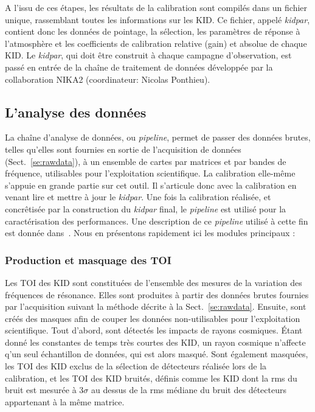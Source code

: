 A l'issu de ces étapes, les résultats de la calibration sont compilés
dans un fichier unique, rassemblant toutes les informations sur les
KID. Ce fichier, appelé \emph{kidpar}, contient donc les données de
pointage, la sélection, les paramètres de réponse à l'atmosphère et
les coefficients de calibration relative (gain) et absolue de chaque
KID. Le \emph{kidpar}, qui doit être construit à chaque campagne
d'observation, est passé en entrée de la chaîne de traitement de
données développée par la collaboration NIKA2 (coordinateur: Nicolas
Ponthieu).

\subsection{L'analyse des données}

La chaîne d'analyse de données, ou \emph{pipeline}, permet de passer
des données brutes, telles qu'elles sont fournies en sortie de
l'acquisition de données (Sect.~\ref{se:rawdata}), à un ensemble de
cartes par matrices et par bandes de fréquence, utilisables pour
l'exploitation scientifique. La calibration elle-même s'appuie en
grande partie sur cet outil. Il s'articule donc avec la calibration en
venant lire et mettre à jour le \emph{kidpar}. Une fois la calibration
réalisée, et concrêtisée par la construction du \emph{kidpar} final,
le \emph{pipeline} est utilisé pour la caractérisation des
performances. Une description de ce \emph{pipeline} utilisé à cette
fin est donnée dans~\citet{Perotto2019}. Nous en présentons rapidement
ici les modules principaux :

\subsubsection{Production et masquage des TOI}
Les TOI des KID sont constituées de l'ensemble des mesures de la
variation des fréquences de résonance. Elles sont produites à partir
des données brutes fournies par l'acquisition suivant la méthode
décrite à la Sect.~\ref{se:rawdata}. Ensuite, sont créés des masques
afin de couper les données non-utilisables pour l'exploitation
scientifique. Tout d'abord, sont détectés les impacts de rayons
cosmiques. \'Etant donné les constantes de temps très courtes des
KID, un rayon cosmique n'affecte q'un seul échantillon de données,
qui est alors masqué. Sont également masquées, les TOI des KID exclus
de la sélection de détecteurs réalisée lors de la calibration, et
les TOI des KID bruités, définis comme les KID dont la rms du bruit
est mesurée à 3$\sigma$ au dessus de la rms médiane du bruit des
détecteurs appartenant à la même matrice.

